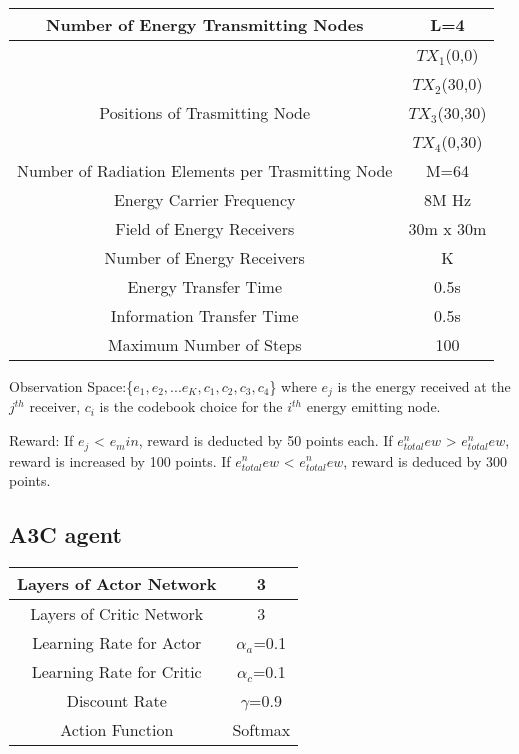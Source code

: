 \begin{small}
\begin{center}
\begin{tabular}{ c c }
\hline
Number of Energy Transmitting Nodes & L=4\\
\hline
&$TX_1$(0,0)\\
&$TX_2$(30,0)\\
{Positions of Trasmitting Node}&$TX_3$(30,30)\\
&$TX_4$(0,30)\\
\hline
Number of Radiation Elements per Trasmitting Node & M=64\\
\hline
Energy Carrier Frequency & 8M Hz\\
\hline
Field of Energy Receivers & 30m x 30m\\
\hline
Number of Energy Receivers & K \\
\hline
Energy Transfer Time & 0.5s \\
\hline
Information Transfer Time & 0.5s\\
\hline
Maximum Number of Steps & 100\\
\hline

\end{tabular}
\end{center}
\end{small}

Observation Space:\{$e_1,e_2,...e_K,c_1,c_2,c_3,c_4$\}
where $e_j$ is the energy received at the $j^{th}$ receiver, $c_i$ is the codebook choice for the $i^{th}$ energy emitting node.

Reward: If $e_j$ < $e_min$, reward is deducted by 50 points each. If $e_{total}^new$ > $e_{total}^new$, reward is increased by 100 points. If $e_{total}^new$ < $e_{total}^new$, reward is deduced by 300 points.

\subsection{A3C agent}
\begin{small}
\begin{center}
\begin{tabular}{ c c }
\hline
Layers of Actor Network & 3\\
\hline
Layers of Critic Network & 3\\
\hline
Learning Rate for Actor & $\alpha_a$=0.1\\
\hline
Learning Rate for Critic & $\alpha_c$=0.1\\
\hline
Discount Rate & $\gamma$=0.9 \\
\hline
Action Function & Softmax \\
\hline

\end{tabular}
\end{center}
\end{small}

